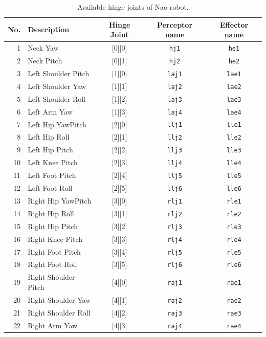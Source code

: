 \begin{table}[htbp]
\centering
\begin{tabular}[htbp]{|r|l|c|c|c|}
  \hline
  {\bf No.} & {\bf Description} & {\bf Hinge Joint} & {\bf Perceptor name} &
  {\bf Effector name} \\ \hline\hline
  1 & Neck Yaw & [0][0] & \texttt{hj1} & \texttt{he1} \\ \hline
  2 & Neck Pitch & [0][1] & \texttt{hj2} & \texttt{he2} \\ \hline
  3 & Left Shoulder Pitch & [1][0] & \texttt{laj1} & \texttt{lae1} \\ \hline
  4 & Left Shoulder Yaw & [1][1] & \texttt{laj2} & \texttt{lae2} \\ \hline
  5 & Left Shoulder Roll & [1][2] & \texttt{laj3} & \texttt{lae3} \\ \hline
  6 & Left Arm Yaw & [1][3] & \texttt{laj4} & \texttt{lae4} \\ \hline
  7 & Left Hip YawPitch & [2][0] & \texttt{llj1} & \texttt{lle1} \\ \hline
  8 & Left Hip Roll & [2][1] & \texttt{llj2} & \texttt{lle2} \\ \hline
  9 & Left Hip Pitch & [2][2] & \texttt{llj3} & \texttt{lle3} \\ \hline
  10 & Left Knee Pitch & [2][3] & \texttt{llj4} & \texttt{lle4} \\ \hline
  11 & Left Foot Pitch & [2][4] & \texttt{llj5} & \texttt{lle5} \\ \hline
  12 & Left Foot Roll & [2][5] & \texttt{llj6} & \texttt{lle6} \\ \hline
  13 & Right Hip YawPitch & [3][0] & \texttt{rlj1} & \texttt{rle1} \\ \hline
  14 & Right Hip Roll & [3][1] & \texttt{rlj2} & \texttt{rle2} \\ \hline
  15 & Right Hip Pitch & [3][2] & \texttt{rlj3} & \texttt{rle3} \\ \hline
  16 & Right Knee Pitch & [3][3] & \texttt{rlj4} & \texttt{rle4} \\ \hline
  17 & Right Foot Pitch & [3][4] & \texttt{rlj5} & \texttt{rle5} \\ \hline
  18 & Right Foot Roll & [3][5] & \texttt{rlj6} & \texttt{rle6} \\ \hline
  19 & Right Shoulder Pitch & [4][0] & \texttt{raj1} & \texttt{rae1} \\ \hline
  20 & Right Shoulder Yaw & [4][1] & \texttt{raj2} & \texttt{rae2} \\ \hline
  21 & Right Shoulder Roll & [4][2] & \texttt{raj3} & \texttt{rae3} \\ \hline
  22 & Right Arm Yaw & [4][3] & \texttt{raj4} & \texttt{rae4} \\
  \hline
\end{tabular}
\caption{Available hinge joints of Nao robot.}
\label{table:naojoints}
\end{table}%


